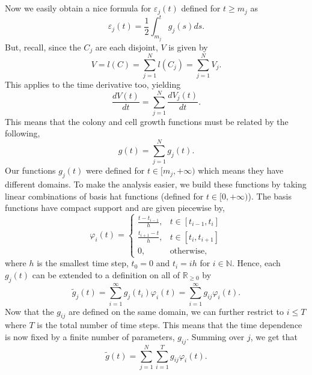 \\
\\
Now we easily obtain a nice formula for $\varepsilon_j(t)$  defined for $t \geq m_j$ as
\begin{equation*}
    \varepsilon_j(t) = \frac{1}{2} \int_{m_j}^t g_j(s)ds.
\end{equation*}
But, recall, since the $C_j$ are each disjoint, $V$ is given by
\begin{equation*}
    V = l(C) = \sum_{j=1}^N l(C_j) = \sum_{j=1}^N V_j.
\end{equation*}
This applies to the time derivative too, yielding 
\begin{equation*}
    \frac{dV(t)}{dt} = \sum_{j=1}^N \frac{dV_j(t)}{dt}.
\end{equation*}
This means that the colony and cell growth functions must be related by the following,
\begin{equation*}
    g(t) = \sum_{j=1}^N g_j (t).
\end{equation*}
Our functions $g_j(t)$ were defined for $t \in [m_j, +\infty)$ which means they have different domains. To make the analysis easier, we build these functions by taking linear combinations of basis hat functions (defined for $t \in [0, +\infty)$). The basis functions have compact support and are given piecewise by,
\begin{equation*}
    \varphi_i(t) = \begin{cases} 
      \frac{t-t_{i-1}}{h}, & t \in [t_{i-1}, t_i] \\
      \frac{t_{i+1}-t}{h}, & t \in [t_{i}, t_{i+1}] \\
      0, & \textrm{otherwise}, 
   \end{cases}
\end{equation*}
where $h$ is the smallest time step, $t_0 = 0$ and $t_i = ih$ for $i \in \mathbb{N}$. Hence, each $g_j(t)$ can be extended to a definition on all of $\mathbb{R}_{\geq 0}$ by
\begin{equation*}
    \tilde{g}_j(t) = \sum_{i=1}^{\infty} g_j(t_i) \varphi_i(t) =\sum_{i=1}^{\infty} g_{ij} \varphi_i(t) .
\end{equation*}
Now that the $g_{ij}$ are defined on the same domain, we can further restrict to $i \leq T$ where $T$ is the total number of time steps. This means that the time dependence is now fixed by a finite number of parameters, $g_{ij}$. Summing over $j$, we get that
\begin{equation*}
    \tilde{g}(t) = \sum_{j=1}^N \sum_{i=1}^{T} g_{ij} \varphi_i(t).
\end{equation*}